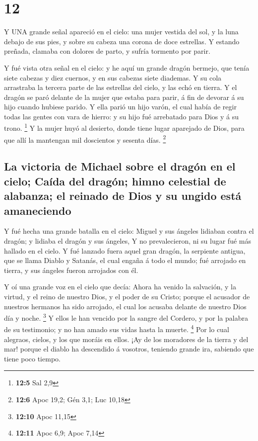 \hypertarget{section-11}{%
\section{12}\label{section-11}}

 Y UNA grande señal apareció en el cielo: una mujer vestida
del sol, y la luna debajo de sus pies, y sobre su cabeza una corona de
doce estrellas.  Y estando preñada, clamaba con dolores de
parto, y sufría tormento por parir.

 Y fué vista otra señal en el cielo: y he aquí un grande
dragón bermejo, que tenía siete cabezas y diez cuernos, y en sus cabezas
siete diademas.  Y su cola arrastraba la tercera parte de
las estrellas del cielo, y las echó en tierra. Y el dragón se paró
delante de la mujer que estaba para parir, á fin de devorar á su hijo
cuando hubiese parido.  Y ella parió un hijo varón, el cual
había de regir todas las gentes con vara de hierro: y su hijo fué
arrebatado para Dios y á su trono. \footnote{\textbf{12:5} Sal 2,9}
 Y la mujer huyó al desierto, donde tiene lugar aparejado de
Dios, para que allí la mantengan mil doscientos y sesenta días.
\footnote{\textbf{12:6} Apoc 19,2; Gén 3,1; Luc 10,18}

\hypertarget{la-victoria-de-michael-sobre-el-draguxf3n-en-el-cielo-cauxedda-del-draguxf3n-himno-celestial-de-alabanza-el-reinado-de-dios-y-su-ungido-estuxe1-amaneciendo}{%
\subsection{La victoria de Michael sobre el dragón en el cielo; Caída
del dragón; himno celestial de alabanza; el reinado de Dios y su ungido
está
amaneciendo}\label{la-victoria-de-michael-sobre-el-draguxf3n-en-el-cielo-cauxedda-del-draguxf3n-himno-celestial-de-alabanza-el-reinado-de-dios-y-su-ungido-estuxe1-amaneciendo}}

 Y fué hecha una grande batalla en el cielo: Miguel y sus
ángeles lidiaban contra el dragón; y lidiaba el dragón y sus ángeles,
 Y no prevalecieron, ni su lugar fué más hallado en el
cielo.  Y fué lanzado fuera aquel gran dragón, la serpiente
antigua, que se llama Diablo y Satanás, el cual engaña á todo el mundo;
fué arrojado en tierra, y sus ángeles fueron arrojados con él.

 Y oí una grande voz en el cielo que decía: Ahora ha venido
la salvación, y la virtud, y el reino de nuestro Dios, y el poder de su
Cristo; porque el acusador de nuestros hermanos ha sido arrojado, el
cual los acusaba delante de nuestro Dios día y noche. \footnote{\textbf{12:10}
  Apoc 11,15}  Y ellos le han vencido por la sangre del
Cordero, y por la palabra de su testimonio; y no han amado sus vidas
hasta la muerte. \footnote{\textbf{12:11} Apoc 6,9; Apoc 7,14}
 Por lo cual alegraos, cielos, y los que moráis en ellos.
¡Ay de los moradores de la tierra y del mar! porque el diablo ha
descendido á vosotros, teniendo grande ira, sabiendo que tiene poco
tiempo.

